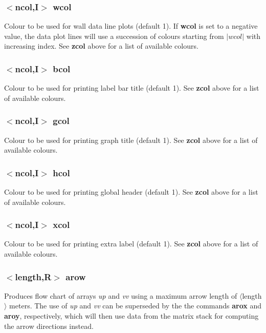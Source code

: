 \documentclass[a4paper,10pt]{report}
\begin{document}
\subsubsection{$<$ncol,{\bf I}$>$ wcol}\label{sec:wcol}
Colour to be used for wall data line plots (default 1).
If {\bf wcol} is set to a negative value, the data plot lines will use
a succession of colours starting from $|wcol|$ with increasing index.
See {\bf zcol} above for a list of available colours.

\subsubsection{$<$ncol,{\bf I}$>$ bcol}\label{sec:bcol}
Colour to be used for printing label bar title (default 1).
See {\bf zcol} above for a list of available colours.

\subsubsection{$<$ncol,{\bf I}$>$ gcol}\label{sec:gcol}
Colour to be used for printing graph title (default 1).
See {\bf zcol} above for a list of available colours.

\subsubsection{$<$ncol,{\bf I}$>$ hcol}\label{sec:hcol}
Colour to be used for printing global header (default 1).
See {\bf zcol} above for a list of available colours.

\subsubsection{$<$ncol,{\bf I}$>$ xcol}\label{sec:xcol}
Colour to be used for printing extra label (default 1).
See {\bf zcol} above for a list of available colours.

\subsubsection{$<$length,{\bf R}$>$ arow}\label{sec:arow}\label{sec:arox}\label{sec:aroy}
Produces flow chart of arrays {\em up} and {\em vv} using a maximum arrow
length of $\langle$length$\rangle$ meters.
The use of {\em up} and {\em vv} can be superseded
by the the commands {\bf arox} and {\bf aroy}, respectively, which will then use
data from the matrix stack for computing the arrow directions instead.
\end{document}

